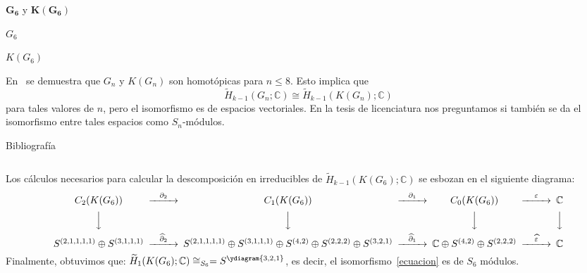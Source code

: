 \documentclass[final,xcolor=svgnames]{beamer}
\begin{document}
\begin{frame}{}
\begin{columns}
\begin{column}{0.5\textwidth}
\begin{block}{$\boldsymbol{G_6}$ y $\boldsymbol{K(G_6)}$}
\begin{minipage}{0.53\linewidth}
    $G_{6}$
  \end{minipage}
  \begin{minipage}{0.4\linewidth}  
    \centering   

    $K(G_{6})$
  \end{minipage}
\end{block}

\begin{block}{}
  En~\cite{chessboard-graphs} se demuestra que $G_{n}$ y $K(G_{n})$
  son homotópicas para $n\leq 8$. Esto implica que
  \begin{equation}
    \label{ecuacion}
    \widetilde H_{k-1}(G_{n};\mathbb{C})\cong \widetilde H_{k-1}(K(G_{n});\mathbb{C})
  \end{equation}
  para tales valores de $n$, pero el isomorfismo es de espacios
  vectoriales. En la tesis de licenciatura nos preguntamos si también
  se da el isomorfismo entre tales espacios \alert{como $S_{n}$-módulos}.
\end{block}

\begin{block}{Bibliografía}
  
  
\end{block}
\end{column}
\end{columns}

  \vfill

  \begin{block}{}
    Los cálculos necesarios para calcular la descomposición en
    irreducibles de $\widetilde H_{k-1}(K(G_{6});\mathbb{C})$ se esbozan
    en el siguiente diagrama:
    \[
    \begin{CD}
      C_{2}(K(G_{6})) @>{\partial_{2}}>> C_{1}(K(G_{6})) @>{\partial_{1}}>> C_{0}(K(G_{6})) @>{\varepsilon}>> \mathbb{C}\\
      @VVV   @VVV   @VVV   @VVV    \\
      S^{(2,1,1,1,1)}\oplus S^{(3,1,1,1)} @>{\widehat\partial_{2}}>>
      S^{(2,1,1,1,1)}\oplus S^{(3,1,1,1)}\oplus S^{(4,2)}\oplus S^{(2,2,2)}\oplus S^{(3,2,1)} @>{\widehat\partial_{1}}>> 
      \mathbb{C} \oplus S^{(4,2)}\oplus S^{(2,2,2)} @>{\widehat \varepsilon}>>  \mathbb{C}
    \end{CD}
    \]
    Finalmente, obtuvimos que: $\widetilde
    H_{1}(K(G_{6});\mathbb{C})\cong_{S_{6}}=S^{\ydiagram{3,2,1}}$, es
    decir, el isomorfismo~\ref{ecuacion} es de $S_{6}$ módulos.
  \end{block}
\end{frame}
\end{document}

